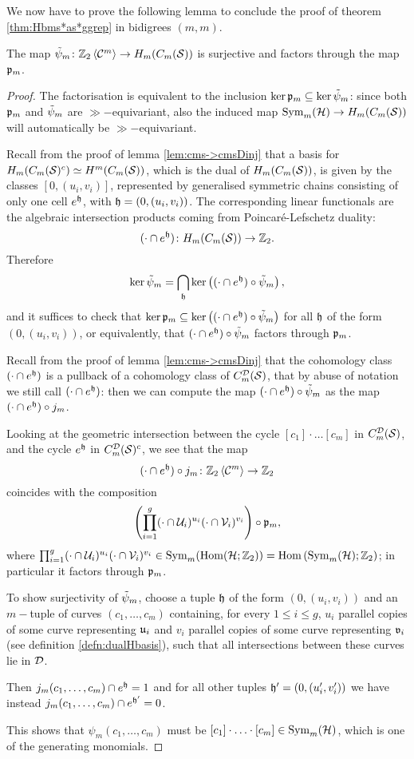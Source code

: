 We now have to prove the following lemma to conclude the proof of theorem \ref{thm:Hbms*as*ggrep}
in bidigrees $(m,m)$.
\begin{lem}
 \label{lem:tpsi->psi}
The map $\tilde\psi_m\colon\mathbb{Z}_2\left<\mathcal{C}^{m}\right>\to H_m(C_m(\mathcal{S}))$ is surjective and factors through the map $\mathfrak{p}_m$.
\end{lem}
\begin{proof}
The factorisation is equivalent to the inclusion $\ker\mathfrak{p}_m\subseteq\ker\tilde\psi_m$: since both
$\mathfrak{p}_m$ and $\tilde\psi_m$
are $\gg-$equivariant, also the induced map $\operatorname{Sym}_m(\mathcal{H})\to H_m(C_m(\mathcal{S}))$ will automatically be
$\gg-$equivariant.

Recall from the proof of lemma \ref{lem:cms->cmsDinj} that a basis for $H_m(C_m(\mathcal{S})^c)\simeq H^m(C_m(\mathcal{S}))$, which is
the dual of $H_m(C_m(\mathcal{S}))$, is given by the classes $[0,(u_i,v_i)]$, represented by generalised
symmetric chains consisting of only one cell $e^{\mathfrak{h}}$, with $\mathfrak{h}=(0,(u_i,v_i))$.
The corresponding linear functionals are the algebraic intersection products
coming from Poincaré-Lefschetz duality:
\[
 (\cdot\cap e^{\mathfrak{h}})\colon H_m(C_m(\mathcal{S}))\to\mathbb{Z}_2.
\]
Therefore
\[
 \ker\tilde\psi_m=\bigcap_{\mathfrak{h}}\ker\left((\cdot\cap e^{\mathfrak{h}})\circ\tilde\psi_m\right),
\]
and it suffices to check that $\ker\mathfrak{p}_m\subseteq\ker\left((\cdot\cap e^{\mathfrak{h}})\circ\tilde\psi_m\right)$
for all $\mathfrak{h}$ of the form $(0,(u_i,v_i))$, or equivalently, that $(\cdot\cap e^{\mathfrak{h}})\circ\tilde\psi_m$ factors through $\mathfrak{p}_m$.

Recall from the proof of lemma \ref{lem:cms->cmsDinj} that the cohomology class $(\cdot\cap e^{\mathfrak{h}})$ is a pullback
of a cohomology class of $C_{m}^{\mathcal{D}}(\mathcal{S})$, that by abuse of notation we still call $(\cdot\cap e^{\mathfrak{h}})$:
then we can compute the map $(\cdot\cap e^{\mathfrak{h}})\circ\tilde\psi_m$ as the map $(\cdot\cap e^{\mathfrak{h}})\circ j_m$.

Looking at the geometric intersection between the cycle $[c_1]\cdot\dots[c_m]$ in
$C_{m}^{\mathcal{D}}(\mathcal{S})$, and the cycle $e^{\mathfrak{h}}$ in $C_{m}^{\mathcal{D}}(\mathcal{S})^c$, we see that the map
\[
(\cdot\cap e^{\mathfrak{h}})\circ j_m\colon \mathbb{Z}_2\left<\mathcal{C}^{m}\right>\to\mathbb{Z}_2
\]
coincides with the composition
\[
\left( \prod_{i=1}^g(\cdot\cap\mathcal{U}_i)^{u_i}(\cdot\cap\mathcal{V}_i)^{v_i}\right)\circ\mathfrak{p}_m,
\]
where $\prod_{i=1}^g(\cdot\cap\mathcal{U}_i)^{u_i}(\cdot\cap\mathcal{V}_i)^{v_i}\in\operatorname{Sym}_m(\operatorname{Hom}(\mathcal{H};\mathbb{Z}_2))=\operatorname{Hom}\left(\operatorname{Sym}_m(\mathcal{H});\mathbb{Z}_2\right)$;
in particular it factors through $\mathfrak{p}_m$.

To show surjectivity of $\tilde\psi_m$, choose a tuple $\mathfrak{h}$ of the form $(0,(u_i,v_i))$
and an $m-$tuple of curves $(c_1,\dots,c_m)$ containing, for every $1\leq i\leq g$, $u_i$ parallel
copies of some curve representing $\mathfrak{u}_i$ and $v_i$ parallel copies of some curve representing
$\mathfrak{v}_i$ (see definition \ref{defn:dualHbasis}), such that all intersections between these curves
lie in $\mathcal{D}$.

Then $j_m(c_1,\dots,c_m)\cap e^{\mathfrak{h}}=1$ and for all
other tuples $\mathfrak{h}'=(0,(u'_i,v'_i))$ we have instead $j_m(c_1,\dots,c_m)\cap e^{\mathfrak{h}'}=0$.

This shows that $\psi_m(c_1,\dots,c_m)$ must be $[c_1]\cdot\ldots\cdot[c_m]\in\operatorname{Sym}_m(\mathcal{H})$, which is
one of the generating monomials.
\end{proof}

